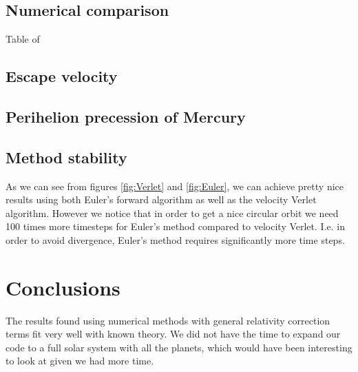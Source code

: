 \documentclass[a4paper, fontsize=11pt]{article}
\begin{document}
\cite{H-Jensen}

\subsection{Numerical comparison}


\begin{table}[h!tb]
    \centering
    \caption{Table of }
\end{table}



\subsection{Escape velocity}






\subsection{Perihelion precession of Mercury}




\subsection{Method stability} 




As we can see from figures \ref{fig:Verlet} and \ref{fig:Euler}, we can achieve pretty nice results using both Euler's forward algorithm as well as the velocity Verlet algorithm. However we notice that in order to get a nice circular orbit we need 100 times more timesteps for Euler's method compared to velocity Verlet. I.e. in order to avoid divergence, Euler's method requires significantly more time steps.



\section{Conclusions}

The results found using numerical methods with general relativity correction terms fit very well with known theory. We did not have the time to expand our code to a full solar system with all the planets, which would have been interesting to look at given we had more time.




\end{document}

